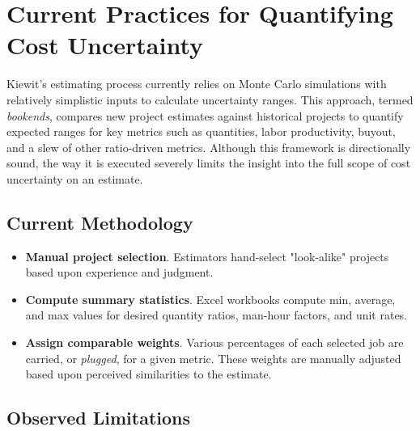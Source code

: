 \documentclass[12pt, a4paper]{article} %
\begin{document}

\section{Current Practices for Quantifying Cost Uncertainty}

Kiewit's estimating process currently relies on Monte Carlo simulations with relatively simplistic inputs to calculate uncertainty ranges. This approach, termed \emph{bookends}, compares new project estimates against historical projects to quantify expected ranges for key metrics such as quantities, labor productivity, buyout, and a slew of other ratio-driven metrics. Although this framework is directionally sound, the way it is executed severely limits the insight into the full scope of cost uncertainty on an estimate.

\subsection*{Current Methodology}

\begin{itemize}
  \item \textbf{Manual project selection}. Estimators hand-select "look-alike" projects based upon experience and judgment.
  \item \textbf{Compute summary statistics}. Excel workbooks compute min, average, and max values for desired quantity ratios, man-hour factors, and unit rates.
  \item \textbf{Assign comparable weights}. Various percentages of each selected job are carried, or \emph{plugged}, for a given metric. These weights are manually adjusted based upon perceived similarities to the estimate. 
\end{itemize}


\subsection*{Observed Limitations}
\end{document}
